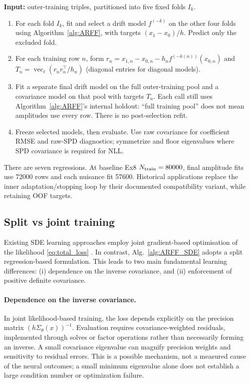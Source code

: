 \documentclass{article}
\begin{document}
\begin{algorithm}[H]\small
\caption{Two-stage ARFF SDE learning with five-fold cross-fitting}\label{alg:ARFF_SDE}
\textbf{Input:} outer-training triples, partitioned into five fixed folds $I_k$.
\begin{enumerate}
\item For each fold $I_k$, fit and select a drift model $f^{(-k)}$ on the other four folds using Algorithm~\ref{alg:ARFF}, with targets $(x_1-x_0)/h$. Predict only the excluded fold.
\item For each training row $n$, form $r_n=x_{1,n}-x_{0,n}-h_nf^{(-k(n))}(x_{0,n})$ and $T_n=\operatorname{vec}_\ell(r_nr_n^\top/h_n)$ (diagonal entries for diagonal models).
\item Fit a separate final drift model on the full outer-training pool and a covariance model on that pool with targets $T_n$. Each call still uses Algorithm~\ref{alg:ARFF}'s internal holdout: ``full training pool'' does not mean amplitudes use every row. There is no post-selection refit.
\item Freeze selected models, then evaluate. Use raw covariance for coefficient RMSE and raw-SPD diagnostics; symmetrize and floor eigenvalues where SPD covariance is required for NLL.
\end{enumerate}
There are seven regressions. At baseline Ex8 $N_{\rm train}=80000$, final amplitude fits use 72000 rows and each nuisance fit 57600. Historical applications replace the inner adaptation/stopping loop by their documented compatibility variant, while retaining OOF targets.
\end{algorithm}

\subsection{Split vs joint training}
\label{sec:split_vs_joint}

Existing SDE learning approaches employ joint gradient-based optimisation of the likelihood \eqref{eq:total_loss} \cite{Dietrich2023,dridi2021learningstochasticdynamicalsystems}. In contrast, Alg.~\ref{alg:ARFF_SDE} adopts a split regression-based formulation. This leads to two main fundamental learning differences: (i) dependence on the inverse covariance, and (ii) enforcement of positive definite covariance.

\paragraph{Dependence on the inverse covariance.}
In joint likelihood-based training, the loss depends explicitly on the precision matrix $(h\Sigma_\theta(x))^{-1}$. Evaluation requires covariance-weighted residuals, implemented through solves or factor operations rather than necessarily forming an inverse. A small covariance eigenvalue can magnify precision weights and sensitivity to residual errors. This is a possible mechanism, not a measured cause of the neural outcomes; a small minimum eigenvalue alone does not establish a large condition number or optimization failure.
\end{document}
